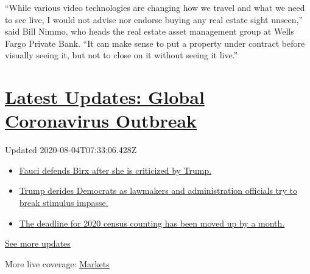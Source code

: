 ``While various video technologies are changing how we travel and what
we need to see live, I would not advise nor endorse buying any real
estate sight unseen,'' said Bill Nimmo, who heads the real estate asset
management group at Wells Fargo Private Bank. ``It can make sense to put
a property under contract before visually seeing it, but not to close on
it without seeing it live.''

\hypertarget{latest-updates-global-coronavirus-outbreak}{%
\section{\texorpdfstring{\href{https://www.nytimes3xbfgragh.onion/2020/08/03/world/coronavirus-covid-19.html?action=click\&pgtype=Article\&state=default\&region=MAIN_CONTENT_1\&context=storylines_live_updates}{Latest
Updates: Global Coronavirus
Outbreak}}{Latest Updates: Global Coronavirus Outbreak}}\label{latest-updates-global-coronavirus-outbreak}}

Updated 2020-08-04T07:33:06.428Z

\begin{itemize}
\tightlist
\item
  \href{https://www.nytimes3xbfgragh.onion/2020/08/03/world/coronavirus-covid-19.html?action=click\&pgtype=Article\&state=default\&region=MAIN_CONTENT_1\&context=storylines_live_updates\#link-4547638f}{Fauci
  defends Birx after she is criticized by Trump.}
\item
  \href{https://www.nytimes3xbfgragh.onion/2020/08/03/world/coronavirus-covid-19.html?action=click\&pgtype=Article\&state=default\&region=MAIN_CONTENT_1\&context=storylines_live_updates\#link-15e7f995}{Trump
  derides Democrats as lawmakers and administration officials try to
  break stimulus impasse.}
\item
  \href{https://www.nytimes3xbfgragh.onion/2020/08/03/world/coronavirus-covid-19.html?action=click\&pgtype=Article\&state=default\&region=MAIN_CONTENT_1\&context=storylines_live_updates\#link-e5a2cda}{The
  deadline for 2020 census counting has been moved up by a month.}
\end{itemize}

\href{https://www.nytimes3xbfgragh.onion/2020/08/03/world/coronavirus-covid-19.html?action=click\&pgtype=Article\&state=default\&region=MAIN_CONTENT_1\&context=storylines_live_updates}{See
more updates}

More live coverage:
\href{https://www.nytimes3xbfgragh.onion/live/2020/08/03/business/stock-market-today-coronavirus?action=click\&pgtype=Article\&state=default\&region=MAIN_CONTENT_1\&context=storylines_live_updates}{Markets}

